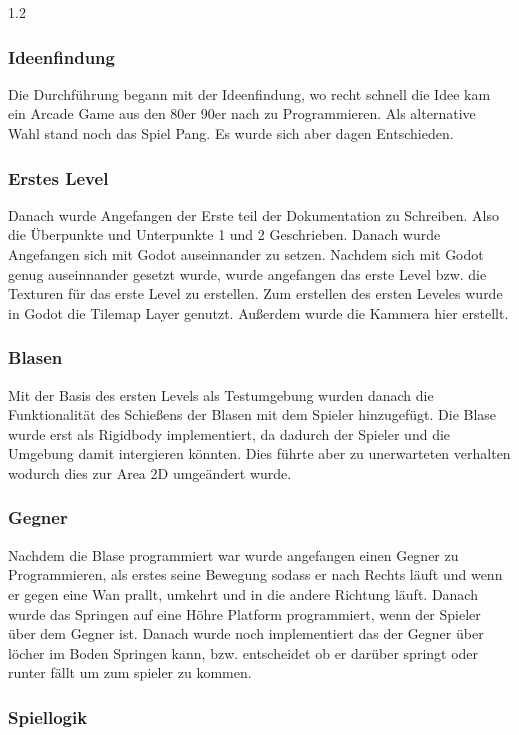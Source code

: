 \documentclass{article}
\newcommand{\Zeilenabstand}{1.2}
\begin{document}
\begin{spacing}{\Zeilenabstand}
\subsubsection{Ideenfindung}

Die Durchführung begann mit der Ideenfindung, wo recht schnell die Idee kam ein 
Arcade Game aus den 80er 90er nach zu Programmieren. Als alternative Wahl stand noch 
das Spiel Pang. Es wurde sich aber dagen Entschieden. 
\subsubsection{Erstes Level}
Danach wurde Angefangen der Erste teil der Dokumentation zu Schreiben. Also die Überpunkte und 
Unterpunkte 1 und 2 Geschrieben. Danach wurde Angefangen sich mit Godot auseinnander zu setzen. 
Nachdem sich mit Godot genug auseinnander gesetzt wurde, wurde angefangen das erste Level bzw. 
die Texturen für das erste Level zu erstellen. Zum erstellen des ersten Leveles wurde in Godot die Tilemap Layer 
genutzt. Außerdem wurde die Kammera hier erstellt. 

\subsubsection{Blasen}

Mit der Basis des ersten Levels als Testumgebung wurden danach die Funktionalität des Schießens der 
Blasen mit dem Spieler hinzugefügt. Die Blase wurde erst als Rigidbody implementiert, da dadurch der 
Spieler und die Umgebung damit intergieren könnten. Dies führte aber zu unerwarteten verhalten wodurch
dies zur Area 2D umgeändert wurde.  

\subsubsection{Gegner}

Nachdem die Blase programmiert war wurde angefangen einen Gegner zu Programmieren, als erstes seine 
Bewegung sodass er nach Rechts läuft und wenn er gegen eine Wan prallt, umkehrt und in die andere 
Richtung läuft. Danach wurde das Springen auf eine Höhre Platform programmiert, wenn der Spieler über
dem Gegner ist. Danach wurde noch implementiert das der Gegner über löcher im Boden Springen kann,
bzw. entscheidet ob er darüber springt oder runter fällt um zum spieler zu kommen. 

\subsubsection{Spiellogik}


\end{spacing}
\end{document}
